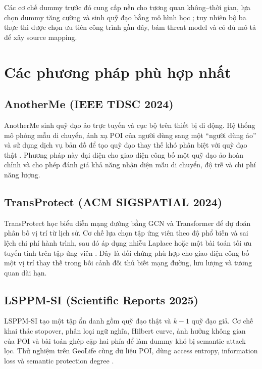 \documentclass[12pt,a4paper,oneside]{report}
\begin{document}
Các cơ chế dummy trước đó cung cấp nền cho tương quan không--thời gian, lựa chọn dummy tăng cường và sinh quỹ đạo bằng mô hình học \citep{liu2017dummy,parmar2023dummy,yang2023gan}; tuy nhiên bộ ba thực thi được chọn ưu tiên công trình gần đây, bám threat model và có đủ mô tả để xây source mapping.

\section{Các phương pháp phù hợp nhất}

\subsection{AnotherMe (IEEE TDSC 2024)}

AnotherMe sinh quỹ đạo ảo trực tuyến và cục bộ trên thiết bị di động. Hệ thống mô phỏng mẫu di chuyển, ánh xạ POI của người dùng sang một ``người dùng ảo'' và sử dụng dịch vụ bản đồ để tạo quỹ đạo thay thế khó phân biệt với quỹ đạo thật \citep{li2024anotherme}. Phương pháp này đại diện cho giao diện công bố một quỹ đạo ảo hoàn chỉnh và cho phép đánh giá khả năng nhận diện mẫu di chuyển, độ trễ và chi phí năng lượng.

\subsection{TransProtect (ACM SIGSPATIAL 2024)}

TransProtect học biểu diễn mạng đường bằng GCN và Transformer để dự đoán phân bố vị trí từ lịch sử. Cơ chế lựa chọn tập ứng viên theo độ phổ biến và sai lệch chi phí hành trình, sau đó áp dụng nhiễu Laplace hoặc một bài toán tối ưu tuyến tính trên tập ứng viên \citep{yadav2024transprotect}. Đây là đối chứng phù hợp cho giao diện công bố một vị trí thay thế trong bối cảnh đối thủ biết mạng đường, lưu lượng và tương quan dài hạn.

\subsection{LSPPM-SI (Scientific Reports 2025)}

LSPPM-SI tạo một tập ẩn danh gồm quỹ đạo thật và $k-1$ quỹ đạo giả. Cơ chế khai thác stopover, phân loại ngữ nghĩa, Hilbert curve, ảnh hưởng không gian của POI và bài toán ghép cặp hai phía để làm dummy khó bị semantic attack lọc. Thử nghiệm trên GeoLife cùng dữ liệu POI, dùng access entropy, information loss và semantic protection degree \citep{kuang2025lsppm}.
\end{document}

